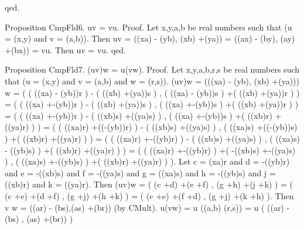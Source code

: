\documentclass{article}
\newenvironment{forthel}{\begin{leftbar}}{\end{leftbar}}
\newcommand{\cmul}{\cdot}
\newcommand{\rmul}{\cdot}
\newcommand{\radd}{+}
\begin{document}
\begin{forthel}
qed.

Proposition CmpFld6. u\cmul v = v\cmul u.
Proof. Let x,y,a,b be real numbers such that (u = (x,y) and v = (a,b)).
Then u\cmul v =  ((x\rmul a) - (y\rmul b), (x\rmul b) \radd  (y\rmul a)) =  ((a\rmul x) - (b\rmul y), (a\rmul y) \radd  (b\rmul x)) = v\cmul u. Then u\cmul v = v\cmul u. qed.

Proposition CmpFld7. (u\cmul v)\cmul w = u\cmul (v\cmul w).
Proof. Let x,y,a,b,r,s be real numbers such that (u = (x,y) and v = (a,b) and w = (r,s)). 
(u\cmul v)\cmul w = (((x\rmul a) - (y\rmul b), (x\rmul b) \radd  (y\rmul a))) \cmul  w 
		  = (  ( ((x\rmul a)  - (y\rmul b))\rmul r ) - ( ((x\rmul b) \radd  (y\rmul a))\rmul s )  ,  ( ((x\rmul a)  - (y\rmul b))\rmul s ) \radd  ( ((x\rmul b) \radd  (y\rmul a))\rmul r ) )
	  	  = (  ( ((x\rmul a) \radd  -(y\rmul b))\rmul r ) - ( ((x\rmul b) \radd  (y\rmul a))\rmul s )  ,  ( ((x\rmul a) \radd  -(y\rmul b))\rmul s ) \radd  ( ((x\rmul b) \radd  (y\rmul a))\rmul r ) )
		  = (  ( ((x\rmul a) \radd  -(y\rmul b))\rmul r ) - ( ((x\rmul b)\rmul s) \radd  ((y\rmul a)\rmul s) )  ,  ( ((x\rmul a) \radd  -(y\rmul b))\rmul s ) \radd  ( ((x\rmul b)\rmul r) \radd  ((y\rmul a)\rmul r) )  )
		  = (  ( ((x\rmul a)\rmul r) \radd  ((-(y\rmul b))\rmul r) ) - ( ((x\rmul b)\rmul s) \radd  ((y\rmul a)\rmul s) )  ,  ( ((x\rmul a)\rmul s) \radd  ((-(y\rmul b))\rmul s) ) \radd  ( ((x\rmul b)\rmul r) \radd  ((y\rmul a)\rmul r) )  ) 
		  = (  ( ((x\rmul a)\rmul r) \radd  -((y\rmul b)\rmul r) ) - ( ((x\rmul b)\rmul s) \radd  ((y\rmul a)\rmul s) )  ,  ( ((x\rmul a)\rmul s) - ((y\rmul b)\rmul s) ) \radd  ( ((x\rmul b)\rmul r) \radd  ((y\rmul a)\rmul r) )  )
		  = (  ( ((x\rmul a)\rmul r) \radd  -((y\rmul b)\rmul r) ) \radd  ( -((x\rmul b)\rmul s) \radd  -((y\rmul a)\rmul s) )  ,  ( ((x\rmul a)\rmul s) \radd  -((y\rmul b)\rmul s) ) \radd  ( ((x\rmul b)\rmul r) \radd  ((y\rmul a)\rmul r) )  ).
Let c = (x\rmul a)\rmul r and d = -((y\rmul b)\rmul r) and e = -((x\rmul b)\rmul s) and f = -((y\rmul a)\rmul s) and g = ((x\rmul a)\rmul s) and  h = -((y\rmul b)\rmul s) and  j = ((x\rmul b)\rmul r) and k = ((y\rmul a)\rmul r).
Then (u\cmul v)\cmul w =  ( (c \radd  d) \radd  (e  \radd  f) , (g \radd  h) \radd   (j \radd  k)  )
      		   =  ( (c \radd  e) \radd  (d \radd  f) , (g \radd   j) \radd  (h  \radd  k) )
      		   = ( (c \radd  e) \radd  (f \radd  d) , (g \radd  j) \radd  (k \radd  h) ).
Then v \cmul  w = ((a\rmul r) - (b\rmul s),(a\rmul s) \radd  (b\rmul r)) (by CMult).
u\cmul (v\cmul w) = u \cmul  ((a,b) \cmul  (r,s)) 
		  = u \cmul  (  ((a\rmul r) - (b\rmul s) , (a\rmul s) \radd  (b\rmul r))  )

\end{forthel}
\end{document}
